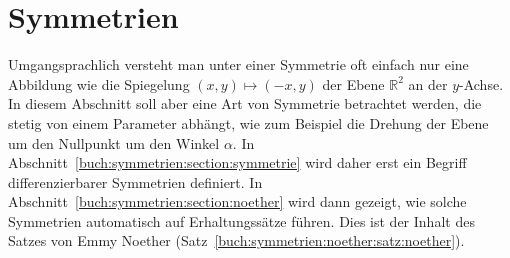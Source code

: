 %
%
%
\chapter{Symmetrien
\label{buch:chapter:symmetrien}}
Umgangsprachlich versteht man unter einer Symmetrie oft einfach  nur
eine Abbildung wie die Spiegelung
\(
(x,y)\mapsto (-x,y)
\)
der Ebene $\mathbb{R}^2$ an der $y$-Achse.
In diesem Abschnitt soll aber eine Art von Symmetrie betrachtet
werden, die stetig von einem Parameter abhängt, wie zum Beispiel
die Drehung der Ebene um den Nullpunkt um den Winkel $\alpha$.
In Abschnitt~\ref{buch:symmetrien:section:symmetrie} wird daher
erst ein Begriff differenzierbarer Symmetrien definiert.
In Abschnitt~\ref{buch:symmetrien:section:noether} wird dann gezeigt,
wie solche Symmetrien automatisch auf Erhaltungssätze führen.
Dies ist der Inhalt des Satzes von Emmy Noether
(Satz~\ref{buch:symmetrien:noether:satz:noether}).





\uebungsabschnitt

\begin{uebungsaufgaben}
\end{uebungsaufgaben}
\enduebungsabschnitt

